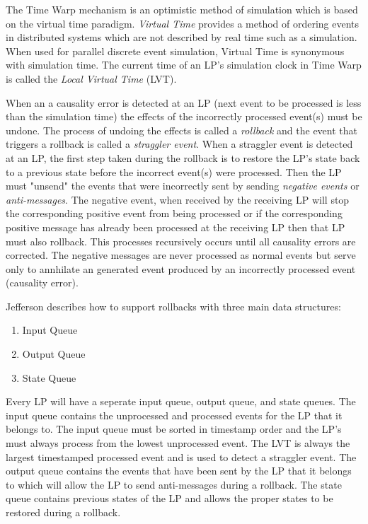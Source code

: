 \documentclass[11pt]{book}
\begin{document}
The Time Warp mechanism is an optimistic method of simulation which is based on the virtual
time paradigm\cite{jefferson-85}. \emph{Virtual Time} provides a method of ordering events
in distributed systems which are not described by real time such as a simulation. When used
for parallel discrete event simulation, Virtual Time is synonymous with simulation time.
The current time of an LP's simulation clock in Time Warp is called the \emph{Local Virtual
Time} (LVT).

When an a causality error is detected at an LP (next event to be processed is less than the
simulation time) the effects of the incorrectly processed event(s) must be undone. The process
of undoing the effects is called a \emph{rollback} and the event that triggers a rollback
is called a \emph{straggler event}. When a straggler event is detected at an LP, the first
step taken during the rollback is to restore the LP's state back to a previous state before
the incorrect event(s) were processed. Then the LP must "unsend" the events that were
incorrectly sent by sending \emph{negative events} or \emph{anti-messages}. The negative
event, when received by the receiving LP will stop the corresponding positive event from
being processed or if the corresponding positive message has already been processed at
the receiving LP then that LP must also rollback. This processes recursively occurs until
all causality errors are corrected. The negative messages are never processed as normal
events but serve only to annhilate an generated event produced by an incorrectly processed
event (causality error).

Jefferson\cite{jefferson-85} describes how to support rollbacks with three main data structures:

\begin{enumerate}
    \item Input Queue
    \item Output Queue
    \item State Queue
\end{enumerate}

\noindent
Every LP will have a seperate input queue, output queue, and state queues. The input
queue contains the unprocessed and processed events for the LP that it belongs to. The
input queue must be sorted in timestamp order and the LP's must always process from the
lowest unprocessed event. The LVT is always the largest timestamped processed event and
is used to detect a straggler event. The output queue contains the events that have been
sent by the LP that it belongs to which will allow the LP to send anti-messages during a
rollback. The state queue contains previous states of the LP and allows the proper states
to be restored during a rollback.
\end{document}

